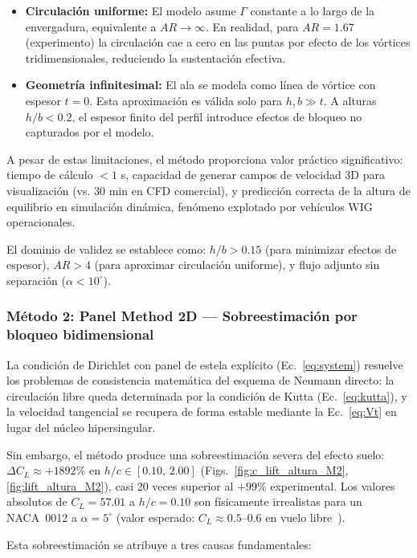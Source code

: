 \documentclass[twocolumn]{article}
\begin{document}
\begin{itemize}
\item \textbf{Circulación uniforme:} El modelo asume $\Gamma$ constante a lo largo de la envergadura, equivalente a $AR \to \infty$. En realidad, para $AR = 1.67$ (experimento) la circulación cae a cero en las puntas por efecto de los vórtices tridimensionales, reduciendo la sustentación efectiva.
 \item \textbf{Geometría infinitesimal:} El ala se modela como línea de vórtice con espesor $t = 0$. Esta aproximación es válida solo para $h, b \gg t$. A alturas $h/b < 0.2$, el espesor finito del perfil introduce efectos de bloqueo no capturados por el modelo.
\end{itemize}

A pesar de estas limitaciones, el método proporciona valor práctico significativo: tiempo de cálculo $< 1$ s, capacidad de generar campos de velocidad 3D para visualización (vs. 30 min en CFD comercial), y predicción correcta de la altura de equilibrio en simulación dinámica, fenómeno explotado por vehículos WIG operacionales.

El dominio de validez se establece como: $h/b > 0.15$ (para minimizar efectos de espesor), $AR > 4$ (para aproximar circulación uniforme), y flujo adjunto sin separación ($\alpha < 10^{\circ}$).

\subsubsection{Método 2: Panel Method 2D --- Sobreestimación por bloqueo bidimensional}
La condición de Dirichlet con panel de estela explícito (Ec.~\eqref{eq:system}) resuelve los problemas de consistencia matemática del esquema de Neumann directo: la circulación libre queda determinada por la condición de Kutta (Ec.~\eqref{eq:kutta}), y la velocidad tangencial se recupera de forma estable mediante la Ec.~\eqref{eq:Vt} en lugar del núcleo hipersingular.

Sin embargo, el método produce una sobreestimación severa del efecto
suelo: $\Delta C_L \approx +1892\%$ en $h/c \in [0.10,\, 2.00]$
(Figs.~\ref{fig:c_lift_altura_M2}, \ref{fig:lift_altura_M2}), casi
20 veces superior al $+99\%$ experimental. Los valores absolutos de
$C_L = 57.01$ a $h/c = 0.10$ son físicamente irrealistas para un
NACA~0012 a $\alpha = 5^\circ$ (valor esperado: $C_L \approx 0.5$--$0.6$ 
en vuelo libre~\cite{anderson2011}).

Esta sobreestimación se atribuye a tres causas fundamentales:
\end{document}
